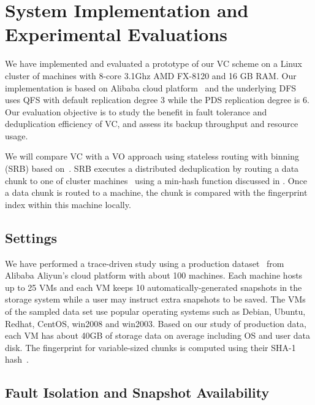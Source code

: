 \section{System Implementation and Experimental Evaluations}
\label{data:impl}
We have implemented and evaluated a prototype of our VC scheme on a Linux cluster of machines with
8-core 3.1Ghz AMD FX-8120 and 16 GB RAM. 
Our implementation is based on Alibaba cloud platform~\cite{Aliyun,WeiZhangIEEE}
and the underlying DFS uses  QFS with default replication degree 3 while the PDS replication degree is 6.
Our evaluation objective is to
study the benefit in fault tolerance and   deduplication efficiency of VC,  
and assess its backup throughput and  resource usage. 

We will compare VC with a VO approach  using stateless routing with binning (SRB) 
based on~\cite{Dong2011,extreme_binning09}.
SRB executes a distributed deduplication by routing a data chunk to one of cluster machines~\cite{Dong2011}
using  a min-hash function discussed in \cite{extreme_binning09}. Once a data chunk is routed to
a machine, the chunk is compared with the fingerprint index within this machine locally. 

\subsection{Settings}
We have performed a trace-driven study using a production dataset~\cite{WeiZhangIEEE} from 
Alibaba Aliyun's cloud platform with about 100 machines. 
Each machine hosts up to 25 VMs and each VM keeps 10 automatically-generated snapshots in the storage system while
a user may instruct extra snapshots to be saved.
The VMs of the sampled data set use popular operating systems such as 
Debian, Ubuntu, Redhat, CentOS, win2008 and win2003. 
Based on our study of production  data,  each VM has about 40GB of storage  data  on average
including OS and user data disk.
The fingerprint for variable-sized chunks is computed using their SHA-1 hash~\cite{similar94,rabin81}. 

\subsection{Fault Isolation and Snapshot Availability}

